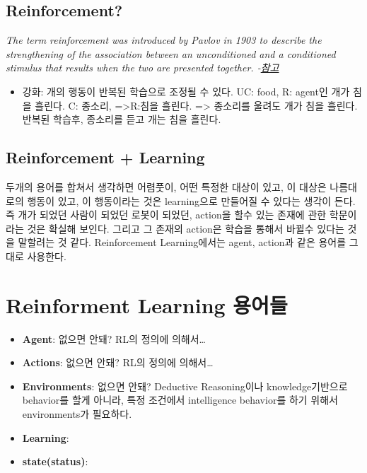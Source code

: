 \documentclass[11pt]{article}
\begin{document}
\subsection{Reinforcement?}
\label{sec:orgb27e9c9}
\begin{note}


\emph{The term reinforcement was introduced by Pavlov in 1903 to describe the strengthening of the association between an unconditioned and a conditioned stimulus that results when the two are presented together. -\href{http://www.scholarpedia.org/article/Reinforcement\#:\~:text=The\%20term\%20reinforcement\%20was\%20introduced,the\%20two\%20are\%20presented\%20together.\&text=The\%20term\%20reinforcement\%20is\%20currently,learning\%20than\%20to\%20stimulus\%20learning.}{참고}}

\begin{itemize}
\item 강화: 개의 행동이 반복된 학습으로 조정될 수 있다.
UC: food, R: agent인 개가 침을 흘린다.
C: 종소리, =>R:침을 흘린다.
=> 종소리를 울려도 개가 침을 흘린다. 반복된 학습후, 종소리를 듣고 개는 침을 흘린다.
\end{itemize}
\end{note}

\subsection{Reinforcement + Learning}
\label{sec:org7c9b89e}

\begin{note}
두개의 용어를 합쳐서 생각하면 어렴풋이, 어떤 특정한 대상이 있고, 이 대상은 나름대로의 행동이 있고, 이 행동이라는 것은 learning으로 만들어질 수 있다는 생각이 든다. 즉 개가 되었던 사람이 되었던 로봇이 되었던, action을 할수 있는 존재에 관한 학문이라는 것은 확실해 보인다. 그리고 그 존재의 action은 학습을 통해서 바뀔수 있다는 것을 말할려는 것 같다. Reinforcement Learning에서는 agent, action과 같은 용어를 그대로 사용한다. 
\end{note}

\section{Reinforment Learning 용어들}
\label{sec:org7dcab86}
\begin{note}
\begin{itemize}
\item \textbf{Agent}: 없으면 안돼? RL의 정의에 의해서\ldots{}
\item \textbf{Actions}: 없으면 안돼? RL의 정의에 의해서\ldots{}
\item \textbf{Environments}: 없으면 안돼? Deductive Reasoning이나 knowledge기반으로 behavior를 할게 아니라, 특정 조건에서 intelligence behavior를 하기 위해서 environments가 필요하다.
\item \textbf{Learning}:
\item \textbf{state(status)}:
\end{itemize}
\end{note}
\end{document}

